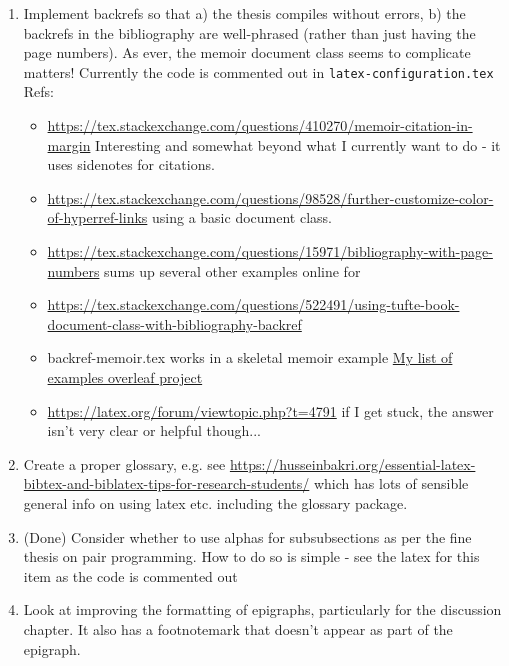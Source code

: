 \begin{enumerate}
    \item Implement backrefs so that a) the thesis compiles without errors, b) the backrefs in the bibliography are well-phrased (rather than just having the page numbers). As ever, the memoir document class seems to complicate matters! Currently the code is commented out in \texttt{latex-configuration.tex} Refs:
    \begin{itemize}
        \item \url{https://tex.stackexchange.com/questions/410270/memoir-citation-in-margin} Interesting and somewhat beyond what I currently want to do - it uses sidenotes for citations.
        \item \url{https://tex.stackexchange.com/questions/98528/further-customize-color-of-hyperref-links} using a basic document class.
        \item \url{https://tex.stackexchange.com/questions/15971/bibliography-with-page-numbers} sums up several other examples online for
        \item \url{https://tex.stackexchange.com/questions/522491/using-tufte-book-document-class-with-bibliography-backref}
        \item backref-memoir.tex works in a skeletal memoir example \href{https://www.overleaf.com/project/612fb5e6f6cc44c10b56afa1}{My list of examples overleaf project}
        \item \url{https://latex.org/forum/viewtopic.php?t=4791} if I get stuck, the answer isn't very clear or helpful though...
    \end{itemize}

    \item Create a proper glossary, e.g. see \url{https://husseinbakri.org/essential-latex-bibtex-and-biblatex-tips-for-research-students/} which has lots of sensible general info on using latex etc. including the glossary package.

    \item (Done) Consider whether to use alphas for subsubsections as per the fine thesis on pair programming. How to do so is simple - see the latex for this item as the code is commented out %

    \item Look at improving the formatting of epigraphs, particularly for the discussion chapter. It also has a footnotemark that doesn't appear as part of the epigraph.


\end{enumerate}
